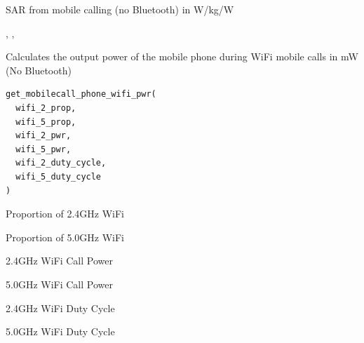 \documentclass[a4paper]{book}
\begin{document}
%
\begin{Value}
SAR from mobile calling (no Bluetooth) in W/kg/W
\end{Value}
%
\begin{SeeAlso}
, , 
\end{SeeAlso}
%
\begin{Description}
Calculates the output power of the mobile phone during WiFi mobile calls in mW (No Bluetooth)
\end{Description}
%
\begin{Usage}
\begin{verbatim}
get_mobilecall_phone_wifi_pwr(
  wifi_2_prop,
  wifi_5_prop,
  wifi_2_pwr,
  wifi_5_pwr,
  wifi_2_duty_cycle,
  wifi_5_duty_cycle
)
\end{verbatim}
\end{Usage}
%
\begin{Arguments}
\begin{ldescription}
\item[\code{wifi\_2\_prop}] Proportion of 2.4GHz WiFi

\item[\code{wifi\_5\_prop}] Proportion of 5.0GHz WiFi

\item[\code{wifi\_2\_pwr}] 2.4GHz WiFi Call Power

\item[\code{wifi\_5\_pwr}] 5.0GHz WiFi Call Power

\item[\code{wifi\_2\_duty\_cycle}] 2.4GHz WiFi Duty Cycle

\item[\code{wifi\_5\_duty\_cycle}] 5.0GHz WiFi Duty Cycle
\end{ldescription}
\end{Arguments}
%
\end{document}
